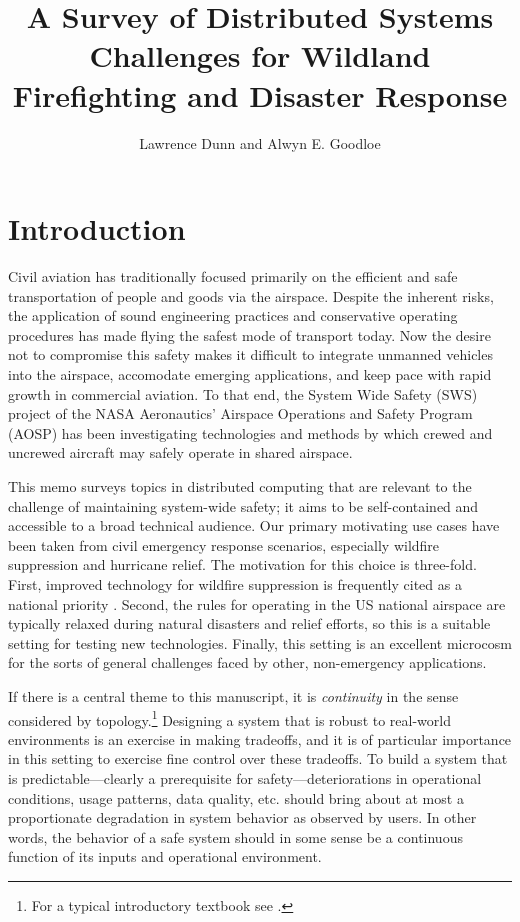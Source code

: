 \documentclass[]             %
{NASA}                       %
\title{A Survey of Distributed Systems Challenges for Wildland
Firefighting and Disaster Response}
\author{Lawrence Dunn and Alwyn E. Goodloe}
\theoremstyle{definition}
\begin{document}
\newpage
\setcounter{tocdepth}{2}
\tableofcontents
\newpage

\section{Introduction}\label{introduction}

Civil aviation has traditionally focused primarily on the efficient and
safe transportation of people and goods via the airspace. Despite the
inherent risks, the application of sound engineering practices and
conservative operating procedures has made flying the safest mode of
transport today. Now the desire not to compromise this safety makes it
difficult to integrate unmanned vehicles into the airspace, accomodate
emerging applications, and keep pace with rapid growth in commercial
aviation. To that end, the System Wide Safety (SWS) project of the NASA
Aeronautics' Airspace Operations and Safety Program (AOSP) has been
investigating technologies and methods by which crewed and uncrewed
aircraft may safely operate in shared airspace.

This memo surveys topics in distributed computing that are relevant to
the \mbox{challenge} of maintaining system-wide safety; it aims to be
self-contained and accessible to a broad technical audience. Our
primary motivating use cases have been taken from civil emergency
response scenarios, especially wildfire suppression and hurricane
relief. The motivation for this choice is three-fold. First, improved
technology for wildfire suppression is frequently cited as a
national priority \cite{pcast2023}.  Second, the rules for operating
in the US national airspace are typically relaxed during natural
disasters and relief efforts, so this is a suitable setting for testing new technologies. Finally, this setting is an excellent
microcosm for the sorts of general challenges faced by other,
non-emergency applications.

If there is a central theme to this manuscript, it is
\emph{continuity} in the sense considered by topology.\footnote{For a
typical introductory textbook see \cite{mendelson2012introduction}.}
Designing a system that is robust to real-world environments is an
exercise in making tradeoffs, and it is of particular importance in
this setting to exercise fine control over these tradeoffs. To build a
system that is predictable---clearly a prerequisite for
safety---deteriorations in operational conditions, usage patterns,
data quality, etc. should bring about at most a proportionate
degradation in system behavior as observed by users. In other words,
the behavior of a safe system should in some sense be a continuous
function of its inputs and operational environment.
\end{document}
